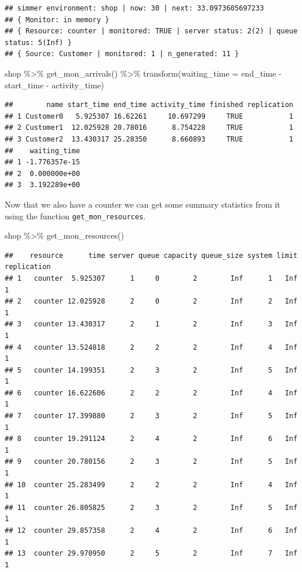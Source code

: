 \documentclass[
]{book}
\newenvironment{Shaded}{\begin{snugshade}}{\end{snugshade}}
\newcommand{\AttributeTok}[1]{\textcolor[rgb]{0.77,0.63,0.00}{#1}}
\newcommand{\FunctionTok}[1]{\textcolor[rgb]{0.00,0.00,0.00}{#1}}
\newcommand{\NormalTok}[1]{#1}
\newcommand{\SpecialCharTok}[1]{\textcolor[rgb]{0.00,0.00,0.00}{#1}}
\begin{document}
\begin{verbatim}
## simmer environment: shop | now: 30 | next: 33.0973605697233
## { Monitor: in memory }
## { Resource: counter | monitored: TRUE | server status: 2(2) | queue status: 5(Inf) }
## { Source: Customer | monitored: 1 | n_generated: 11 }
\end{verbatim}

\begin{Shaded}
\begin{Highlighting}[]
\NormalTok{shop }\SpecialCharTok{\%\textgreater{}\%}
  \FunctionTok{get\_mon\_arrivals}\NormalTok{() }\SpecialCharTok{\%\textgreater{}\%}
  \FunctionTok{transform}\NormalTok{(}\AttributeTok{waiting\_time =}\NormalTok{ end\_time }\SpecialCharTok{{-}}\NormalTok{ start\_time }\SpecialCharTok{{-}}\NormalTok{ activity\_time)}
\end{Highlighting}
\end{Shaded}

\begin{verbatim}
##        name start_time end_time activity_time finished replication
## 1 Customer0   5.925307 16.62261     10.697299     TRUE           1
## 2 Customer1  12.025928 20.78016      8.754228     TRUE           1
## 3 Customer2  13.430317 25.28350      8.660893     TRUE           1
##    waiting_time
## 1 -1.776357e-15
## 2  0.000000e+00
## 3  3.192289e+00
\end{verbatim}

Now that we also have a counter we can get some summary statistics from it using the function \texttt{get\_mon\_resources}.

\begin{Shaded}
\begin{Highlighting}[]
\NormalTok{shop }\SpecialCharTok{\%\textgreater{}\%} \FunctionTok{get\_mon\_resources}\NormalTok{()}
\end{Highlighting}
\end{Shaded}

\begin{verbatim}
##    resource      time server queue capacity queue_size system limit replication
## 1   counter  5.925307      1     0        2        Inf      1   Inf           1
## 2   counter 12.025928      2     0        2        Inf      2   Inf           1
## 3   counter 13.430317      2     1        2        Inf      3   Inf           1
## 4   counter 13.524818      2     2        2        Inf      4   Inf           1
## 5   counter 14.199351      2     3        2        Inf      5   Inf           1
## 6   counter 16.622606      2     2        2        Inf      4   Inf           1
## 7   counter 17.399880      2     3        2        Inf      5   Inf           1
## 8   counter 19.291124      2     4        2        Inf      6   Inf           1
## 9   counter 20.780156      2     3        2        Inf      5   Inf           1
## 10  counter 25.283499      2     2        2        Inf      4   Inf           1
## 11  counter 26.805825      2     3        2        Inf      5   Inf           1
## 12  counter 29.857358      2     4        2        Inf      6   Inf           1
## 13  counter 29.970950      2     5        2        Inf      7   Inf           1
\end{verbatim}
\end{document}
